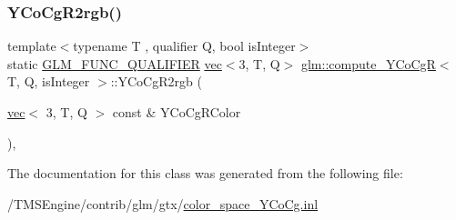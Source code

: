 \mbox{\label{classglm_1_1compute___y_co_cg_r_a90eb0aada34098a657429dea2323e00a}} 
\subsubsection{\texorpdfstring{Y\+Co\+Cg\+R2rgb()}{YCoCgR2rgb()}}
{\footnotesize\ttfamily template$<$typename T , qualifier Q, bool is\+Integer$>$ \\
static \hyperlink{setup_8hpp_a33fdea6f91c5f834105f7415e2a64407}{G\+L\+M\+\_\+\+F\+U\+N\+C\+\_\+\+Q\+U\+A\+L\+I\+F\+I\+ER} \hyperlink{structglm_1_1vec}{vec}$<$3, T, Q$>$ \hyperlink{classglm_1_1compute___y_co_cg_r}{glm\+::compute\+\_\+\+Y\+Co\+CgR}$<$ T, Q, is\+Integer $>$\+::Y\+Co\+Cg\+R2rgb (\begin{DoxyParamCaption}\item[{\hyperlink{structglm_1_1vec}{vec}$<$ 3, T, Q $>$ const \&}]{Y\+Co\+Cg\+R\+Color }\end{DoxyParamCaption})\hspace{0.3cm}{\ttfamily [inline]}, {\ttfamily [static]}}



The documentation for this class was generated from the following file\+:\begin{DoxyCompactItemize}
\item 
/\+T\+M\+S\+Engine/contrib/glm/gtx/\hyperlink{color__space___y_co_cg_8inl}{color\+\_\+space\+\_\+\+Y\+Co\+Cg.\+inl}\end{DoxyCompactItemize}
